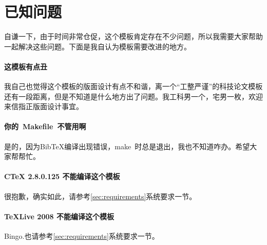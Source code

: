 

\chapter{已知问题}
\label{chap:needsomehelp}

自谦一下，由于时间非常仓促，这个模板肯定存在不少问题，所以我需要大家帮助一起解决这些问题。下面是我自认为模板需要改进的地方。

\subsubsection*{这模板有点丑}
我自己也觉得这个模板的版面设计有点不和谐，离一个“工整严谨”的科技论文模板还有一段距离，但是不知道是什么地方出了问题。我工科男一个，宅男一枚，欢迎来信指正版面设计事宜。

\subsubsection*{你的~Makefile~不管用啊}
是的，因为BibTeX编译出现错误，make~时总是退出，我也不知道咋办。希望大家帮帮忙。

\subsubsection*{CTeX 2.8.0.125 不能编译这个模板}
很抱歉，确实如此，请参考\ref{sec:requirements}系统要求一节。

\subsubsection*{TeXLive 2008 不能编译这个模板}
Bingo.也请参考\ref{sec:requirements}系统要求一节。

